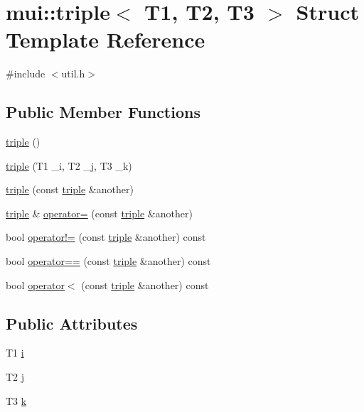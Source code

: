 \hypertarget{structmui_1_1triple}{}\section{mui\+:\+:triple$<$ T1, T2, T3 $>$ Struct Template Reference}
\label{structmui_1_1triple}


{\ttfamily \#include $<$util.\+h$>$}

\subsection*{Public Member Functions}
\begin{DoxyCompactItemize}
\item 
\hyperlink{structmui_1_1triple_ac785524bd6bde13bb2cc63c1032807e4}{triple} ()
\item 
\hyperlink{structmui_1_1triple_a8df5fd0ecd47c89de83072bde1a39b14}{triple} (T1 \+\_\+i, T2 \+\_\+j, T3 \+\_\+k)
\item 
\hyperlink{structmui_1_1triple_a66865d104e59020489ca142b6b55414c}{triple} (const \hyperlink{structmui_1_1triple}{triple} \&another)
\item 
\hyperlink{structmui_1_1triple}{triple} \& \hyperlink{structmui_1_1triple_afdcc6a5f9597efffe7f745cd992295e8}{operator=} (const \hyperlink{structmui_1_1triple}{triple} \&another)
\item 
bool \hyperlink{structmui_1_1triple_a229f081bf54be89f215591c04fe590b3}{operator!=} (const \hyperlink{structmui_1_1triple}{triple} \&another) const
\item 
bool \hyperlink{structmui_1_1triple_a126405199031f10cc137387441c71449}{operator==} (const \hyperlink{structmui_1_1triple}{triple} \&another) const
\item 
bool \hyperlink{structmui_1_1triple_aec87abdf489f0ab9c9aeb7b5b32a83e3}{operator$<$} (const \hyperlink{structmui_1_1triple}{triple} \&another) const
\end{DoxyCompactItemize}
\subsection*{Public Attributes}
\begin{DoxyCompactItemize}
\item 
T1 \hyperlink{structmui_1_1triple_ad0100211cd92f6a517934ddb893f64d8}{i}
\item 
T2 \hyperlink{structmui_1_1triple_a26e88cc76064ce7181528c4685205e5e}{j}
\item 
T3 \hyperlink{structmui_1_1triple_a34456ec40e7bfdeb5ee0933cb0f2c5ba}{k}
\end{DoxyCompactItemize}


